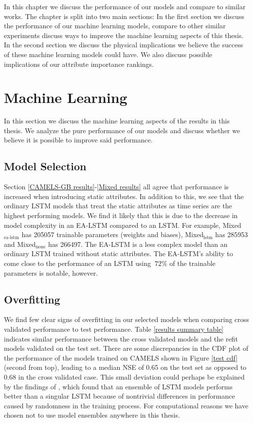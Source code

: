 In this chapter we discuss the performance of our models and compare to similar 
works. The chapter is split into two main sections: In the first section we 
discuss the performance of our machine learning models, compare to other similar 
experiments discuss ways to improve the machine learning aspects of this thesis.
In the second section we discuss the physical implications we believe the success 
of these machine learning models could have. We also discuss possible implications 
of our attribute importance rankings. 
\section{Machine Learning}
In this section we discuss the machine learning aspects of the results in this thesis.
We analyze the pure performance of our models and discuss whether we believe it 
is possible to improve said performance.
\subsection{Model Selection}
\label{discuss model selection}
Section \ref{CAMELS-GB results}-\ref{Mixed results} 
all agree that performance is increased when introducing static attributes. In 
addition to this, we see that the ordinary LSTM models that treat the static 
attributes as time series are the highest performing models. We find it likely that 
this is due  to the decrease in model complexity in an EA-LSTM compared to an LSTM. 
For example, Mixed$_\text{ea-lstm}$ has 205057 trainable parameters (weights and 
biases), Mixed$_\text{lstm}$ has 285953 and Mixed$_\text{none}$ has 266497. The 
EA-LSTM is a less complex model than an ordinary LSTM trained without 
static attributes. The EA-LSTM's ability to come close to the performance of an 
LSTM using $~72\%$ of the trainable parameters is notable, however. 
\subsection{Overfitting}
We find few clear signs of overfitting in our selected models when comparing 
cross validated performance to test performance. Table 
\ref{results summary table} indicates 
similar performance between the cross validated models and the refit models 
validated on the test set. There are some discrepancies in the CDF plot of 
the performance of the models trained on CAMELS 
shown in Figure \ref{test cdf} (second from top), leading to a median NSE of 
0.65 on the test set as opposed to 0.68 in the cross validated case. This small 
deviation could perhaps be explained by the findings of \citet{lstm_second_paper},
 which found that an ensemble of LSTM models performs better than a singular LSTM 
 because of nontrivial differences in performance caused by randomness in the 
 training process. For computational reasons we have chosen not to use model 
 ensembles anywhere in this thesis.

